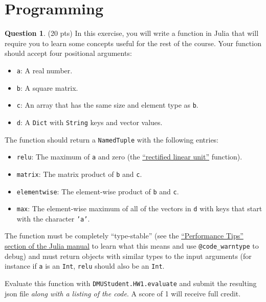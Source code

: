 \documentclass{article}
\theoremstyle{definition}
\newtheorem{question}[thm]{Question}
\begin{document}
\section{Programming}

\begin{question} (20 pts)
    In this exercise, you will write a function in Julia that will require you to learn some concepts useful for the rest of the course. Your function should accept four positional arguments:
    \begin{itemize}[nosep]
        \item \texttt{a}: A real number.
        \item \texttt{b}: A square matrix.
        \item \texttt{c}: An array that has the same size and element type as \texttt{b}.
        \item \texttt{d}: A \texttt{Dict} with \texttt{String} keys and vector values.
    \end{itemize}
    The function should return a \texttt{NamedTuple} with the following entries:
    \begin{itemize}[nosep]
        \item \texttt{relu}: The maximum of \texttt{a} and zero (the \href{https://en.wikipedia.org/wiki/Rectifier_(neural_networks)}{``rectified linear unit''} function).
        \item \texttt{matrix}: The matrix product of \texttt{b} and \texttt{c}.
        \item \texttt{elementwise}: The element-wise product of \texttt{b} and \texttt{c}.
        \item \texttt{max}: The element-wise maximum of all of the vectors in \texttt{d} with keys that start with the character \texttt{'a'}.
    \end{itemize}

    The function must be completely ``type-stable'' (see the \href{https://docs.julialang.org/en/v1/manual/performance-tips/#Write-%22type-stable%22-functions}{``Performance Tips'' section of the Julia manual} to learn what this means and use \texttt{@code\_warntype} to debug) and must return objects with similar types to the input arguments (for instance if \texttt{a} is an \texttt{Int}, \texttt{relu} should also be an \texttt{Int}.

    Evaluate this function with \texttt{DMUStudent.HW1.evaluate} and submit the resulting json file \textit{along with a listing of the code}. A score of 1 will receive full credit.
\end{question}
\end{document}
